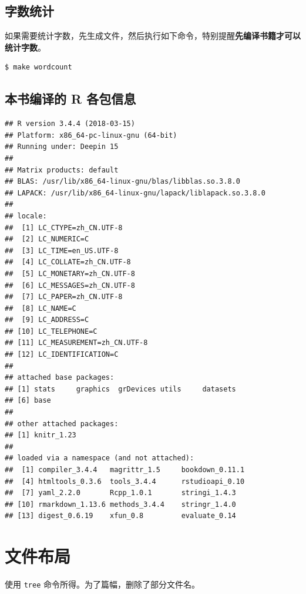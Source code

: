 \documentclass[doctor,openright,twoside]{sjtuthesis}
\newcommand{\passthrough}[1]{#1}
\theoremstyle{plain}
\theoremstyle{definition}
\theoremstyle{remark}
\theoremstyle{ocrenumbox}
\theoremstyle{plain}
\begin{document}
\hypertarget{section-145}{%
\subsection{字数统计}\label{section-145}}

如果需要统计字数，先生成文件，然后执行如下命令，特别提醒\textbf{先编译书籍才可以统计字数}。

\begin{lstlisting}[language=bash, numbers=none]
$ make wordcount
\end{lstlisting}

\hypertarget{r-}{%
\subsection{本书编译的 R 各包信息}\label{r-}}

\begin{lstlisting}
## R version 3.4.4 (2018-03-15)
## Platform: x86_64-pc-linux-gnu (64-bit)
## Running under: Deepin 15
## 
## Matrix products: default
## BLAS: /usr/lib/x86_64-linux-gnu/blas/libblas.so.3.8.0
## LAPACK: /usr/lib/x86_64-linux-gnu/lapack/liblapack.so.3.8.0
## 
## locale:
##  [1] LC_CTYPE=zh_CN.UTF-8      
##  [2] LC_NUMERIC=C              
##  [3] LC_TIME=en_US.UTF-8       
##  [4] LC_COLLATE=zh_CN.UTF-8    
##  [5] LC_MONETARY=zh_CN.UTF-8   
##  [6] LC_MESSAGES=zh_CN.UTF-8   
##  [7] LC_PAPER=zh_CN.UTF-8      
##  [8] LC_NAME=C                 
##  [9] LC_ADDRESS=C              
## [10] LC_TELEPHONE=C            
## [11] LC_MEASUREMENT=zh_CN.UTF-8
## [12] LC_IDENTIFICATION=C       
## 
## attached base packages:
## [1] stats     graphics  grDevices utils     datasets 
## [6] base     
## 
## other attached packages:
## [1] knitr_1.23
## 
## loaded via a namespace (and not attached):
##  [1] compiler_3.4.4   magrittr_1.5     bookdown_0.11.1 
##  [4] htmltools_0.3.6  tools_3.4.4      rstudioapi_0.10 
##  [7] yaml_2.2.0       Rcpp_1.0.1       stringi_1.4.3   
## [10] rmarkdown_1.13.6 methods_3.4.4    stringr_1.4.0   
## [13] digest_0.6.19    xfun_0.8         evaluate_0.14
\end{lstlisting}

\hypertarget{section-146}{%
\section{文件布局}\label{section-146}}

使用 \passthrough{\lstinline!tree!} 命令所得。为了篇幅，删除了部分文件名。
\end{document}
